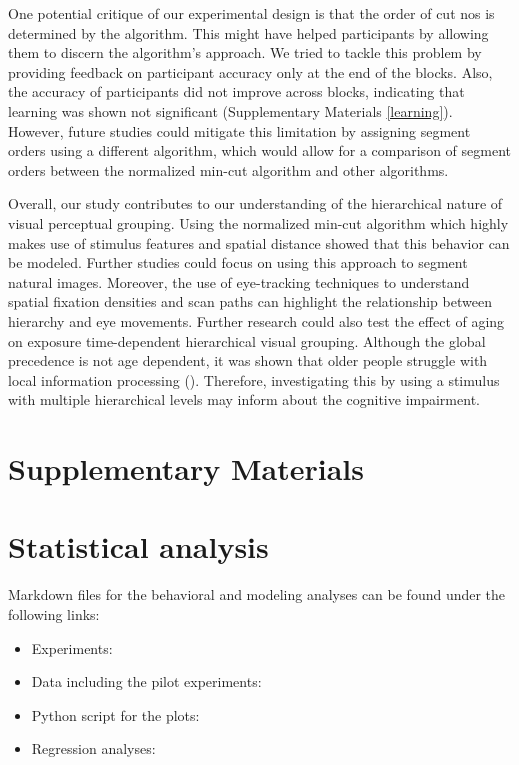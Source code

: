 \documentclass{article}
\begin{document}
One potential critique of our experimental design is that the order of cut nos is determined by the algorithm. This might have helped participants by allowing them to discern the algorithm's approach. We tried to tackle this problem by providing feedback on participant accuracy only at the end of the blocks. Also, the accuracy of participants did not improve across blocks, indicating that learning was shown not significant (Supplementary Materials \ref{learning}). However, future studies could mitigate this limitation by assigning segment orders using a different algorithm, which would allow for a comparison of segment orders between the normalized min-cut algorithm and other algorithms.

Overall, our study contributes to our understanding of the hierarchical nature of visual perceptual grouping. Using the normalized min-cut algorithm which highly makes use of stimulus features and spatial distance showed that this behavior can be modeled. Further studies could focus on using this approach to segment natural images. Moreover, the use of eye-tracking techniques to understand spatial fixation densities and scan paths can highlight the relationship between hierarchy and eye movements. Further research could also test the effect of aging on exposure time-dependent hierarchical visual grouping. Although the global precedence is not age dependent, it was shown that older people struggle with local information processing (\cite{RN236}). Therefore, investigating this by using a stimulus with multiple hierarchical levels may inform about the cognitive impairment.

\clearpage


\printbibliography
\clearpage

\appendix
{}
\section*{Supplementary Materials}
\section{Statistical analysis}
Markdown files for the behavioral and modeling analyses can be found under the following links:
\begin{itemize}
    \item Experiments:
    \item Data including the pilot experiments:
    \item Python script for the plots:
    \item Regression analyses:
\end{itemize}
\clearpage
\end{document}
